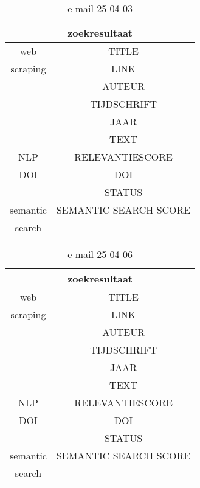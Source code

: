 \begin{table}[h!]
    \caption{e-mail 25-04-03}
    \centering
    \begin{tabular}{|c|c|} 
        \hline
        \multicolumn{2}{|c|}{\textbf{zoekresultaat}} \\
        \hline
        web &TITLE\\
        scraping&LINK\\
        &AUTEUR\\
        &TIJDSCHRIFT\\
        &JAAR\\
        &TEXT\\
        \hline
        NLP&RELEVANTIESCORE\\
        \hline
        DOI&DOI\\
        &STATUS\\
        \hline
        semantic&SEMANTIC SEARCH SCORE\\
        search&\\
        \hline
    \end{tabular}
    \label{table:email20250403}
\end{table}
\begin{table}[h!]
    \caption{e-mail 25-04-06}
    \centering
    \begin{tabular}{|c|c|} 
        \hline
        \multicolumn{2}{|c|}{\textbf{zoekresultaat}} \\
        \hline
        web &TITLE\\
        scraping&LINK\\
        &AUTEUR\\
        &TIJDSCHRIFT\\
        &JAAR\\
        &TEXT\\
        \hline
        NLP&RELEVANTIESCORE\\
        \hline
        DOI&DOI\\
        &STATUS\\
        \hline
        semantic&SEMANTIC SEARCH SCORE\\
        search&\\
        \hline
    \end{tabular}
    \label{table:email20250406}
\end{table}
